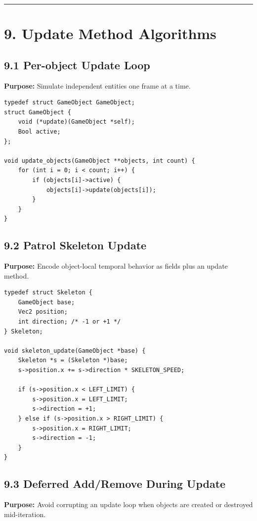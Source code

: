 \documentclass[10pt,letterpaper]{article}
\begin{document}
\medskip\hrule\medskip

\clearpage
\section{9. Update Method Algorithms}

\subsection{9.1 Per-object Update Loop}

\textbf{Purpose:} Simulate independent entities one frame at a time.

\begin{verbatim}
typedef struct GameObject GameObject;
struct GameObject {
    void (*update)(GameObject *self);
    Bool active;
};

void update_objects(GameObject **objects, int count) {
    for (int i = 0; i < count; i++) {
        if (objects[i]->active) {
            objects[i]->update(objects[i]);
        }
    }
}
\end{verbatim}

\subsection{9.2 Patrol Skeleton Update}

\textbf{Purpose:} Encode object-local temporal behavior as fields plus an update method.

\begin{verbatim}
typedef struct Skeleton {
    GameObject base;
    Vec2 position;
    int direction; /* -1 or +1 */
} Skeleton;

void skeleton_update(GameObject *base) {
    Skeleton *s = (Skeleton *)base;
    s->position.x += s->direction * SKELETON_SPEED;

    if (s->position.x < LEFT_LIMIT) {
        s->position.x = LEFT_LIMIT;
        s->direction = +1;
    } else if (s->position.x > RIGHT_LIMIT) {
        s->position.x = RIGHT_LIMIT;
        s->direction = -1;
    }
}
\end{verbatim}

\subsection{9.3 Deferred Add/Remove During Update}

\textbf{Purpose:} Avoid corrupting an update loop when objects are created or destroyed mid-iteration.
\end{document}
